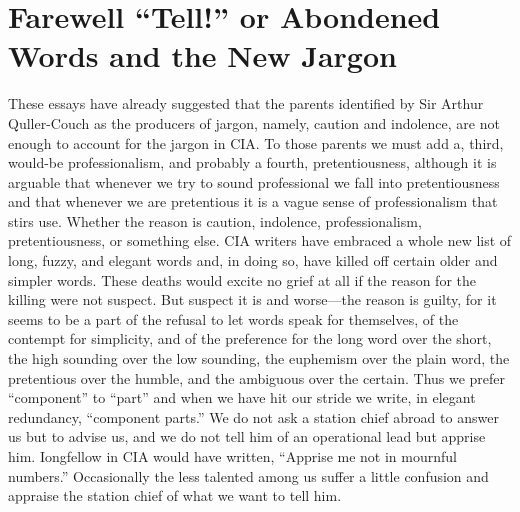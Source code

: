 \documentclass[
    oneside,
    11pt,
    draft
]{memoir}
\begin{document}
\chapter{Farewell \enquote{Tell!} or Abondened Words and the New Jargon}

These essays have already suggested that the parents identified by Sir Arthur Quller-Couch as the producers of jargon, namely, caution and indolence, are not enough to account for the jargon in CIA. To those parents we must add a, third,  would-be professionalism, and probably a fourth, pretentiousness, although it is arguable that whenever we try to sound professional we fall into pretentiousness and that whenever we are pretentious it is a vague sense of professionalism that stirs use. Whether the reason is caution, indolence, professionalism, pretentiousness, or something else. CIA writers have embraced a whole new list of long, fuzzy, and elegant words and, in doing so, have killed off certain older and simpler words. These deaths would excite no grief at all if the reason for the killing were not suspect. But suspect it is and worse---the reason is guilty, for it seems to be a part of the refusal to let words speak for themselves, of the contempt for simplicity, and of the preference for the long word over the short, the high sounding over the low sounding, the euphemism over the plain word, the pretentious over the humble, and the ambiguous over the certain. Thus we prefer \enquote{component} to \enquote{part} and when we have hit our stride we write, in elegant redundancy, \enquote{component parts.} We do not ask a station chief abroad to answer us but to advise us, and we do not tell him of an operational lead but apprise him. Iongfellow in CIA would have written, \enquote{Apprise me not in mournful numbers.} Occasionally the less talented among us suffer a little confusion and appraise the station chief of what we want to tell him.
\end{document}

